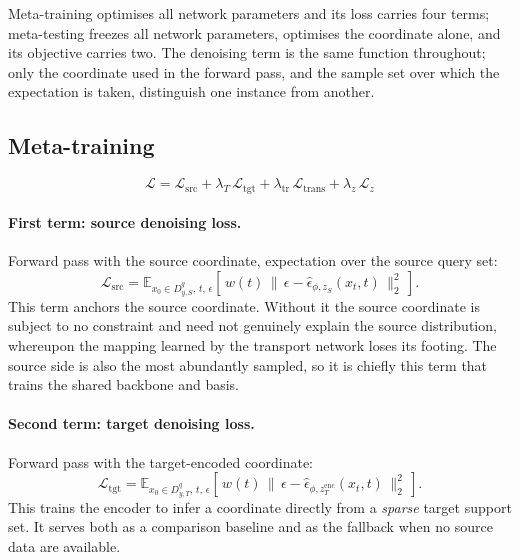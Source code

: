 \documentclass[11pt]{article}
\newcommand{\epshat}{\hat{\epsilon}}
\newcommand{\zS}{z_{S}}
\newcommand{\zencT}{z^{\mathrm{enc}}_{T}}
\newcommand{\Dqs}{D^{q}_{y,S}}
\newcommand{\Dqt}{D^{q}_{y,T}}
\begin{document}
Meta-training optimises all network parameters and its loss carries four terms; meta-testing freezes
all network parameters, optimises the coordinate alone, and its objective carries two. The denoising
term is the same function throughout; only the coordinate used in the forward pass, and the sample
set over which the expectation is taken, distinguish one instance from another.

\subsection{Meta-training}

\begin{equation}
\mathcal{L}
= \mathcal{L}_{\mathrm{src}}
+ \lambda_T\,\mathcal{L}_{\mathrm{tgt}}
+ \lambda_{\mathrm{tr}}\,\mathcal{L}_{\mathrm{trans}}
+ \lambda_z\,\mathcal{L}_{z}
\end{equation}

\paragraph{First term: source denoising loss.} Forward pass with the source coordinate, expectation
over the source query set:
\begin{equation}
\mathcal{L}_{\mathrm{src}}
= \mathbb{E}_{x_0\in\Dqs,\,t,\,\epsilon}
  \left[\, w(t)\,\bigl\|\,\epsilon-\epshat_{\phi,\zS}(x_t,t)\,\bigr\|_2^2 \,\right].
\end{equation}
This term anchors the source coordinate. Without it the source coordinate is subject to no
constraint and need not genuinely explain the source distribution, whereupon the mapping learned by
the transport network loses its footing. The source side is also the most abundantly sampled, so it
is chiefly this term that trains the shared backbone and basis.

\paragraph{Second term: target denoising loss.} Forward pass with the target-encoded coordinate:
\begin{equation}
\mathcal{L}_{\mathrm{tgt}}
= \mathbb{E}_{x_0\in\Dqt,\,t,\,\epsilon}
  \left[\, w(t)\,\bigl\|\,\epsilon-\epshat_{\phi,\zencT}(x_t,t)\,\bigr\|_2^2 \,\right].
\end{equation}
This trains the encoder to infer a coordinate directly from a \emph{sparse} target support set. It
serves both as a comparison baseline and as the fallback when no source data are available.
\end{document}
